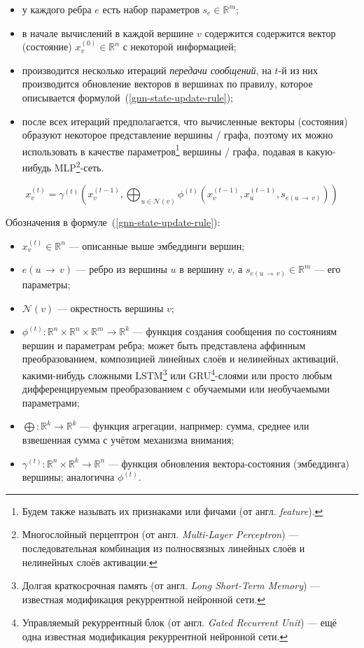 \begin{itemize}
    \item у каждого ребра $e$ есть набор параметров $s_e \in \mathbb{R}^m$;
    \item в начале вычислений в каждой вершине $v$ содержится содержится вектор (состояние) $x_v^{(0)} \in \mathbb{R}^n$ с некоторой информацией;
    \item производится несколько итераций \textit{передачи сообщений}, на $t$-й из них производится обновление векторов в вершинах по правилу, которое описывается формулой~(\ref{gnn-state-update-rule});
    \item после всех итераций предполагается, что вычисленные векторы (состояния) образуют некоторое представление вершины / графа, поэтому их можно использовать в качестве параметров\footnote{Будем также называть их признаками или фичами (от англ. \textit{feature}).} вершины / графа, подавая в какую-нибудь MLP\footnote{Многослойный перцептрон (от англ. \textit{Multi-Layer Perceptron}) --- последовательная комбинация из полносвязных линейных слоёв и нелинейных слоёв активации.}-сеть.
\end{itemize}

\begin{equation} \label{gnn-state-update-rule}
    x_v^{(t)} = \gamma^{(t)} \left(x_v^{(t - 1)}, \bigoplus_{u \in \mathcal{N}(v)} \phi^{(t)} \left(x_v^{(t - 1)}, x_u^{(t - 1)}, s_{e(u \, \to \, v)} \right) \right)
\end{equation}

Обозначения в формуле~(\ref{gnn-state-update-rule}):

\begin{itemize}
    \item $x_v^{(t)} \in \mathbb{R}^n$ --- описанные выше эмбеддинги вершин;
    \item $e(u \, \to \, v)$ --- ребро из вершины $u$ в вершину $v$, а $s_{e(u \, \to \, v)} \in \mathbb{R}^m$ --- его параметры;
    \item $\mathcal{N}(v)$ --- окрестность вершины $v$;
    \item $\phi^{(t)}: \mathbb{R}^n \times \mathbb{R}^n \times \mathbb{R}^m \to \mathbb{R}^k$ --- функция создания сообщения по состояниям вершин и параметрам ребра; может быть представлена аффинным преобразованием, композицией линейных слоёв и нелинейных активаций, какими-нибудь сложными LSTM\footnote{Долгая краткосрочная память (от англ. \textit{Long Short-Term Memory}) --- известная модификация рекуррентной нейронной сети.} или GRU\footnote{Управляемый рекуррентный блок (от англ. \textit{Gated Recurrent Unit}) --- ещё одна известная модификация рекуррентной нейронной сети.}-слоями \cite{gated-graph-conv-paper} или просто любым дифференцируемым преобразованием с обучаемыми или необучаемыми параметрами;
    \item $\bigoplus: \mathbb{R}^k \to \mathbb{R}^k$ --- функция агрегации, например: сумма, среднее или взвешенная сумма с учётом механизма внимания;
    \item $\gamma^{(t)}: \mathbb{R}^n \times \mathbb{R}^k \to \mathbb{R}^n$ --- функция обновления вектора-состояния (эмбеддинга) вершины; аналогична $\phi^{(t)}$.
\end{itemize}

